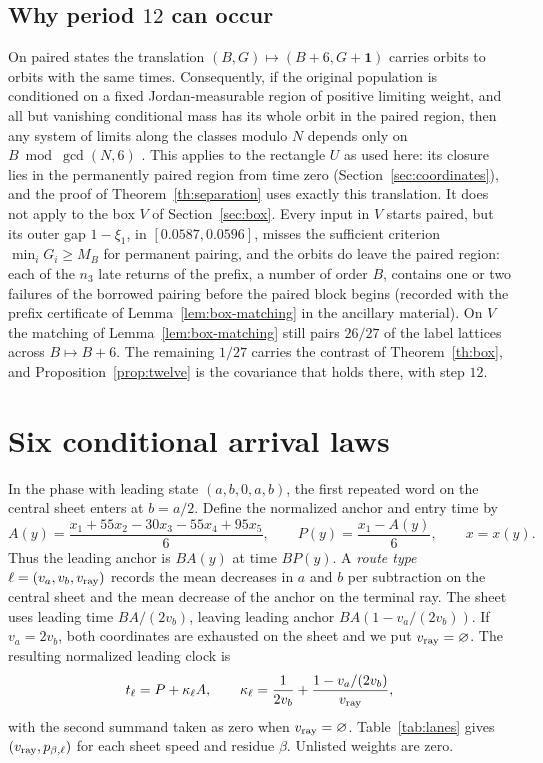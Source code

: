 \documentclass[11pt,reqno]{amsart}
\theoremstyle{remark}
\newcommand{\one}{\boldsymbol 1}
\begin{document}
\subsection*{Why period \(12\) can occur}
On paired states the translation \((B,G)\mapsto(B+6,G+\one)\) carries orbits to orbits with the same times. Consequently, if the original population is conditioned on a fixed Jordan-measurable region of positive limiting weight, and all but vanishing conditional mass has its whole orbit in the paired region, then any system of limits along the classes modulo \(N\) depends only on \(B\bmod\gcd(N,6)\) \cite[Theorem~4]{G4}. This applies to the rectangle \(U\) as used here: its closure lies in the permanently paired region from time zero (Section~\ref{sec:coordinates}), and the proof of Theorem~\ref{th:separation} uses exactly this translation. It does not apply to the box \(V\) of Section~\ref{sec:box}. Every input in \(V\) starts paired, but its outer gap \(1-\xi_1\), in \([0.0587,0.0596]\), misses the sufficient criterion \(\min_iG_i\ge M_B\) for permanent pairing, and the orbits do leave the paired region: each of the \(n_3\) late returns of the prefix, a number of order \(B\), contains one or two failures of the borrowed pairing before the paired block begins (recorded with the prefix certificate of Lemma~\ref{lem:box-matching} in the ancillary material). On \(V\) the matching of Lemma~\ref{lem:box-matching} still pairs \(26/27\) of the label lattices across \(B\mapsto B+6\). The remaining \(1/27\) carries the contrast of Theorem~\ref{th:box}, and Proposition~\ref{prop:twelve} is the covariance that holds there, with step \(12\).

\section{Six conditional arrival laws}\label{sec:mixture}

In the phase with leading state \((a,b,0,a,b)\), the first repeated word on the central sheet enters at \(b=a/2\). Define the normalized anchor and entry time by
\begin{equation}\label{eq:anchor}
 A(y)=\frac{x_1+55x_2-30x_3-55x_4+95x_5}{6},\qquad P(y)=\frac{x_1-A(y)}6,
 \qquad x=x(y).
\end{equation}
Thus the leading anchor is \(BA(y)\) at time \(BP(y)\). A \emph{route type} \(\ell=(v_a,v_b,v_{\rm ray})\) records the mean decreases in \(a\) and \(b\) per subtraction on the central sheet and the mean decrease of the anchor on the terminal ray. The sheet uses leading time \(BA/(2v_b)\), leaving leading anchor \(BA(1-v_a/(2v_b))\). If \(v_a=2v_b\), both coordinates are exhausted on the sheet and we put \(v_{\rm ray}=\varnothing\). The resulting normalized leading clock is
\begin{equation}\label{eq:clock}
 t_\ell=P+\kappa_\ell A,\qquad
 \kappa_\ell=\frac1{2v_b}+\frac{1-v_a/(2v_b)}{v_{\rm ray}},
\end{equation}
with the second summand taken as zero when \(v_{\rm ray}=\varnothing\). Table~\ref{tab:lanes} gives \((v_{\rm ray},p_{\beta,\ell})\) for each sheet speed and residue \(\beta\). Unlisted weights are zero.
\end{document}
